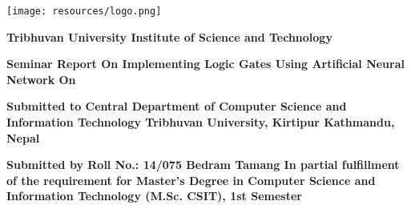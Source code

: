 \begin{center}
	\texttt{[image: resources/logo.png]}
\end{center}

\begin{center}
	\textbf{
		Tribhuvan University
		\linebreak
		Institute of Science and Technology 
	}
\end{center}


\begin{center}
	\vspace{2cm}
	\textbf{
		Seminar Report 
		\linebreak
		On
		\linebreak
		Implementing Logic Gates Using Artificial Neural Network
		On}
\end{center}

\begin{center}
	\vspace{2cm}
	\textbf{
		Submitted to 
		\linebreak
		Central Department of Computer Science and Information Technology
		\linebreak
		Tribhuvan University, Kirtipur
		Kathmandu, Nepal
	}
\end{center}

\begin{center}
	\vspace{2cm}
	\textbf{
		Submitted by
		\linebreak
		Roll No.: 14/075
		\linebreak
		Bedram Tamang
		\linebreak
		In partial fulfillment of the requirement for Master's Degree in Computer Science and Information Technology (M.Sc. CSIT), 1st Semester
	}
\end{center}


\clearpage
